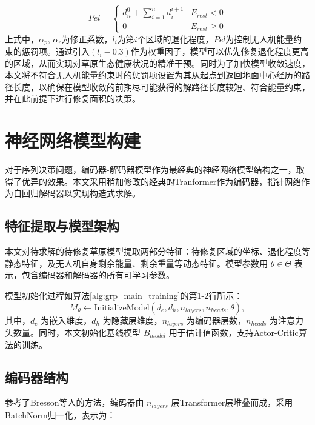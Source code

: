 \documentclass[AutoFakeBold]{LZUThesis}
\begin{document}
\begin{equation}
	Pel=\left\{\begin{array}{ll}
		d_{n}^{0}+\sum\limits_{i=1}^{n}d_{i}^{i+1} & E_{rest}<0     \\
		0                                          & E_{rest}\geq 0
	\end{array}\right.
	\label{eq:12}
\end{equation}
上式中，$\alpha_p$, $\alpha_r$为修正系数，$l_i$为第$i$个区域的退化程度，$Pel$为控制无人机能量约束的惩罚项。通过引入$(l_i-0.3)$作为权重因子，模型可以优先修复退化程度更高的区域，从而实现对草原生态健康状况的精准干预。同时为了加快模型收敛速度，本文将不符合无人机能量约束时的惩罚项设置为其从起点到返回地面中心经历的路径长度，以确保在模型收敛的前期尽可能获得的解路径长度较短、符合能量约束，并在此前提下进行修复面积的决策。

\section{神经网络模型构建}

对于序列决策问题，编码器-解码器模型\cite{vaswani2017attention}作为最经典的神经网络模型结构之一，取得了优异的效果。本文采用稍加修改的经典的Tranformer作为编码器，指针网络\cite{vinyals2015pointer}作为自回归解码器以实现构造式求解。

\subsection{特征提取与模型架构}

本文对待求解的待修复草原模型提取两部分特征：待修复区域的坐标、退化程度等静态特征，及无人机自身剩余能量、剩余重量等动态特征。模型参数用 $\theta \in \Theta$ 表示，包含编码器和解码器的所有可学习参数。

模型初始化过程如算法\ref{alg:grp_main_training}的第1-2行所示：
\begin{equation}
	M_{\theta} \leftarrow \text{InitializeModel}(d_e, d_h, n_{layers}, n_{heads}, \theta),
\end{equation}
其中，$d_e$ 为嵌入维度，$d_h$ 为隐藏层维度，$n_{layers}$ 为编码器层数，$n_{heads}$ 为注意力头数量。同时，本文初始化基线模型 $B_{model}$ 用于估计值函数，支持Actor-Critic算法的训练。

\subsection{编码器结构}

参考了Bresson\cite{bresson2021transformer}等人的方法，编码器由 $n_{layers}$ 层Transformer层堆叠而成，采用BatchNorm归一化，表示为：
\end{document}
